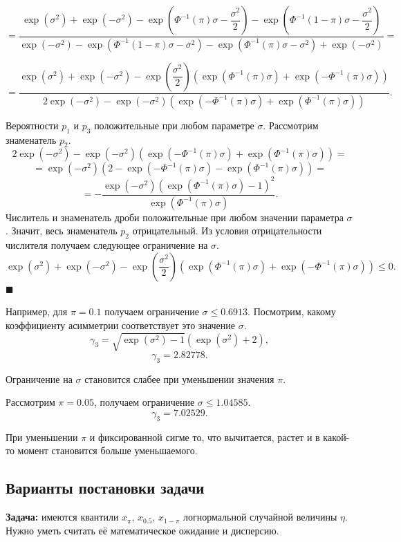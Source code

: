 \documentclass[12pt]{article}
\newenvironment{Proof}{\par\noindent{\bf Доказательство.}}{\hfill$\scriptstyle\blacksquare$}
\begin{document}
\begin{Proof}
		\[=\dfrac{\exp(\sigma^{2})+\exp(-\sigma^{2})-\exp(\Phi^{-1}(\pi)\sigma-\dfrac{\sigma^{2}}{2})-\exp(\Phi^{-1}(1-\pi)\sigma-\dfrac{\sigma^{2}}{2})}{\exp(-\sigma^{2})-\exp(\Phi^{-1}(1-\pi)\sigma-\sigma^{2})-\exp(\Phi^{-1}(\pi)\sigma-\sigma^{2})+\exp(-\sigma^{2})}=\]
		
		\[=\dfrac{\exp(\sigma^{2})+\exp(-\sigma^{2})-\exp\left( \dfrac{\sigma^{2}}{2}\right)\left(\exp(\Phi^{-1}(\pi)\sigma)+\exp(-\Phi^{-1}(\pi)\sigma)\right) }{2\exp(-\sigma^{2})-\exp(-\sigma^{2})\left( \exp(-\Phi^{-1}(\pi)\sigma)+\exp(\Phi^{-1}(\pi)\sigma)\right) }.\]
		
		Вероятности $p_{1}$ и $p_{3}$ положительные при любом параметре $\sigma$. Рассмотрим знаменатель $p_{2}$.
		\[2\exp(-\sigma^{2})-\exp(-\sigma^{2})\left( \exp(-\Phi^{-1}(\pi)\sigma)+\exp(\Phi^{-1}(\pi)\sigma)\right)=\]
		\[=\exp(-\sigma^{2})(2- \exp(-\Phi^{-1}(\pi)\sigma)-\exp(\Phi^{-1}(\pi)\sigma))=\]
		\[=-\dfrac{\exp(-\sigma^{2})(\exp(\Phi^{-1}(\pi)\sigma)-1)^{2}}{\exp(\Phi^{-1}(\pi)\sigma)}.\]
		Числитель и знаменатель дроби положительные при любом значении параметра $\sigma$. Значит, весь знаменатель $p_{2}$ отрицательный. Из условия отрицательности числителя получаем следующее ограничение на $\sigma$.
		\[\exp(\sigma^{2})+\exp(-\sigma^{2})-\exp\left( \dfrac{\sigma^{2}}{2}\right)\left(\exp(\Phi^{-1}(\pi)\sigma)+\exp(-\Phi^{-1}(\pi)\sigma)\right) \leq 0.\]
	\end{Proof}
	
	
	Например, для $\pi=0.1$ получаем ограничение $\sigma\leq 0.6913$. 
	Посмотрим, какому коэффициенту асимметрии соответствует это значение $\sigma$.
	\[\gamma_{3} = \sqrt{\exp(\sigma^{2})-1}(\exp(\sigma^{2})+2),\]
	\[\gamma_{3} = 2.82778.\]
	
	Ограничение на $\sigma$ становится слабее при уменьшении значения $\pi$.
	
	Рассмотрим $\pi = 0.05$, получаем ограничение $\sigma \leq 1.04585$.
	\[\gamma_{3} = 7.02529.\]
	
	При уменьшении $\pi$ и фиксированной сигме то, что вычитается, растет и в какой-то момент становится больше уменьшаемого.
	
	
	\subsection{Варианты постановки задачи}
	
	\textbf{Задача:} имеются квантили $x_{\pi}$, $x_{0.5}$, $x_{1-\pi}$ логнормальной случайной величины $\eta$. Нужно уметь считать её математическое ожидание и дисперсию.
	
\end{document}
